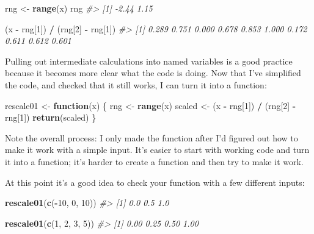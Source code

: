 \documentclass[]{book}
\newenvironment{Shaded}{\begin{snugshade}}{\end{snugshade}}
\newcommand{\KeywordTok}[1]{\textcolor[rgb]{0.13,0.29,0.53}{\textbf{#1}}}
\newcommand{\DecValTok}[1]{\textcolor[rgb]{0.00,0.00,0.81}{#1}}
\newcommand{\StringTok}[1]{\textcolor[rgb]{0.31,0.60,0.02}{#1}}
\newcommand{\CommentTok}[1]{\textcolor[rgb]{0.56,0.35,0.01}{\textit{#1}}}
\newcommand{\ControlFlowTok}[1]{\textcolor[rgb]{0.13,0.29,0.53}{\textbf{#1}}}
\newcommand{\OperatorTok}[1]{\textcolor[rgb]{0.81,0.36,0.00}{\textbf{#1}}}
\newcommand{\NormalTok}[1]{#1}
\begin{document}
\begin{Shaded}
\begin{Highlighting}[]
\NormalTok{rng <-}\StringTok{ }\KeywordTok{range}\NormalTok{(x)}
\NormalTok{rng}
\CommentTok{#> [1] -2.44  1.15}

\NormalTok{(x }\OperatorTok{-}\StringTok{ }\NormalTok{rng[}\DecValTok{1}\NormalTok{]) }\OperatorTok{/}\StringTok{ }\NormalTok{(rng[}\DecValTok{2}\NormalTok{] }\OperatorTok{-}\StringTok{ }\NormalTok{rng[}\DecValTok{1}\NormalTok{])}
\CommentTok{#>  [1] 0.289 0.751 0.000 0.678 0.853 1.000 0.172 0.611 0.612 0.601}
\end{Highlighting}
\end{Shaded}

Pulling out intermediate calculations into named variables is a good
practice because it becomes more clear what the code is doing. Now that
I've simplified the code, and checked that it still works, I can turn it
into a function:

\begin{Shaded}
\begin{Highlighting}[]
\NormalTok{rescale01 <-}\StringTok{ }\ControlFlowTok{function}\NormalTok{(x) \{}
\NormalTok{  rng <-}\StringTok{ }\KeywordTok{range}\NormalTok{(x)}
\NormalTok{  scaled <-}\StringTok{ }\NormalTok{(x }\OperatorTok{-}\StringTok{ }\NormalTok{rng[}\DecValTok{1}\NormalTok{]) }\OperatorTok{/}\StringTok{ }\NormalTok{(rng[}\DecValTok{2}\NormalTok{] }\OperatorTok{-}\StringTok{ }\NormalTok{rng[}\DecValTok{1}\NormalTok{])}
  \KeywordTok{return}\NormalTok{(scaled)}
\NormalTok{\}}
\end{Highlighting}
\end{Shaded}

Note the overall process: I only made the function after I'd figured out
how to make it work with a simple input. It's easier to start with
working code and turn it into a function; it's harder to create a
function and then try to make it work.

At this point it's a good idea to check your function with a few
different inputs:

\begin{Shaded}
\begin{Highlighting}[]
\KeywordTok{rescale01}\NormalTok{(}\KeywordTok{c}\NormalTok{(}\OperatorTok{-}\DecValTok{10}\NormalTok{, }\DecValTok{0}\NormalTok{, }\DecValTok{10}\NormalTok{))}
\CommentTok{#> [1] 0.0 0.5 1.0}

\KeywordTok{rescale01}\NormalTok{(}\KeywordTok{c}\NormalTok{(}\DecValTok{1}\NormalTok{, }\DecValTok{2}\NormalTok{, }\DecValTok{3}\NormalTok{, }\DecValTok{5}\NormalTok{))}
\CommentTok{#> [1] 0.00 0.25 0.50 1.00}
\end{Highlighting}
\end{Shaded}
\end{document}
